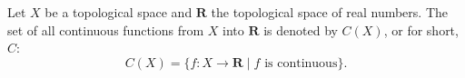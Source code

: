 Let $X$ be a topological space and $\mathbf{R}$ the topological space of real numbers. The set of all continuous functions from $X$ into $\mathbf{R}$ is denoted by $C(X)$, or for short, $C$:
$$C(X) = \{f : X \to \mathbf{R} \mid f \text{ is continuous}\}.$$
